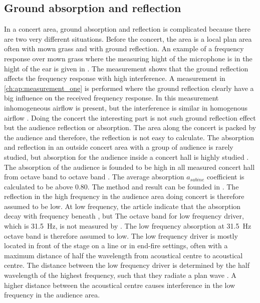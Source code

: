 \subsection{Ground absorption and reflection}\label{ana:ground_ref}
In a concert area, ground absorption and reflection is complicated because there are two very different situations. Before the concert, the area is a local plan area often with mown grass and with ground reflection.  An example of a frequency response over mown grass where the measuring hight of the microphone is in the hight of the ear is given in \citep{review_of_sound}. The measurement shows that the ground reflection affects the frequency response with high interference. 
A measurement in \autoref{ch:ap:measurement_one} is performed where the ground reflection clearly have a big influence on the received frequency response. In this measurement inhomogeneous airflow is present, but the interference is similar in homogenous airflow \citep{review_of_sound}. Doing the concert the interesting part is not such ground reflection effect but the audience reflection or absorption.  The area along the concert is packed by the audience and therefore, the reflection is not easy to calculate. The absorption and reflection in an outside concert area with a group of audience is rarely studied, but absorption for the audience inside a concert hall is highly studied \citep{audience_abso}. The absorption of the audience is founded to be high in all measured concert hall from  octave band to  octave band \citep{audience_abso}. The average absorption $a_{sabine}$ coefficient is calculated to be above 0.80. The method and result can be founded in \citep{audience_abso}. The reflection in the high frequency in the audience area doing concert is therefore assumed to be low. At low frequency, the article \citep{audience_abso} indicate that the absorption decay with frequency beneath  , but The octave band for low frequency driver, which is \SI{31.5}{\hertz}, is not measured by \citep{audience_abso}. The low frequency absorption at \SI{31.5}{\hertz} octave band is therefore assumed to low. The low frequency driver is mostly located in front of the stage on a line or in end-fire settings, often with a maximum distance of half the wavelength from acoustical centre to acoustical centre. The distance between the low frequency driver is determined by the half wavelength of the highest frequency, such that they radiate a plan wave \citep{bauman2001wavefront}. A higher distance between the acoustical centre causes interference in the low frequency in the audience area. 



